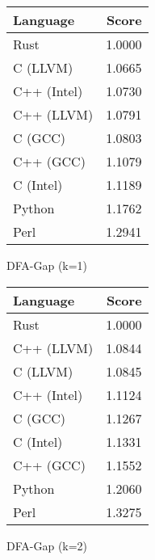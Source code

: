 \begin{subtable}{0.33\textwidth}
    \centering
    \begin{tabular}{|l|r|}
        \hline
        Language & Score \\
        \hline
        Rust & 1.0000 \\
        C (LLVM) & 1.0665 \\
        C++ (Intel) & 1.0730 \\
        C++ (LLVM) & 1.0791 \\
        C (GCC) & 1.0803 \\
        C++ (GCC) & 1.1079 \\
        C (Intel) & 1.1189 \\
        Python & 1.1762 \\
        Perl & 1.2941 \\
        \hline
    \end{tabular}
    \caption{DFA-Gap (k=1)}
    \label{table:energy:dfa_gap(1)}
\end{subtable}%
\begin{subtable}{0.33\textwidth}
    \centering
    \begin{tabular}{|l|r|}
        \hline
        Language & Score \\
        \hline
        Rust & 1.0000 \\
        C++ (LLVM) & 1.0844 \\
        C (LLVM) & 1.0845 \\
        C++ (Intel) & 1.1124 \\
        C (GCC) & 1.1267 \\
        C (Intel) & 1.1331 \\
        C++ (GCC) & 1.1552 \\
        Python & 1.2060 \\
        Perl & 1.3275 \\
        \hline
    \end{tabular}
    \caption{DFA-Gap (k=2)}
    \label{table:energy:dfa_gap(2)}
\end{subtable}
